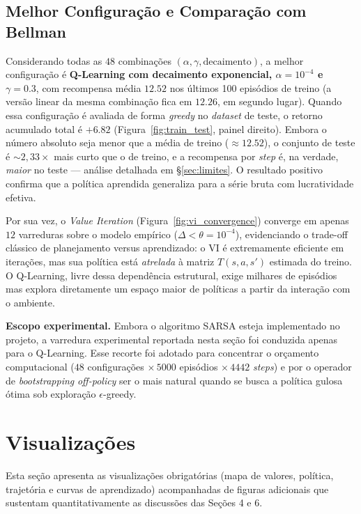 \documentclass{article}
\begin{document}
\subsection{Melhor Configuração e Comparação com Bellman}
Considerando todas as $48$ combinações $(\alpha, \gamma, \text{decaimento})$, a melhor configuração é \textbf{Q-Learning com decaimento exponencial, $\alpha=10^{-4}$ e $\gamma=0.3$}, com recompensa média $12.52$ nos últimos 100 episódios de treino (a versão linear da mesma combinação fica em $12.26$, em segundo lugar). Quando essa configuração é avaliada de forma \textit{greedy} no \textit{dataset} de teste, o retorno acumulado total é $+6.82$ (Figura~\ref{fig:train_test}, painel direito). Embora o número absoluto seja menor que a média de treino ($\approx 12.52$), o conjunto de teste é $\sim$$2{,}33\times$ mais curto que o de treino, e a recompensa por \textit{step} é, na verdade, \textit{maior} no teste — análise detalhada em §\ref{sec:limites}. O resultado positivo confirma que a política aprendida generaliza para a série bruta com lucratividade efetiva.

Por sua vez, o \textit{Value Iteration} (Figura~\ref{fig:vi_convergence}) converge em apenas $12$ varreduras sobre o modelo empírico ($\Delta < \theta = 10^{-4}$), evidenciando o trade-off clássico de planejamento versus aprendizado: o VI é extremamente eficiente em iterações, mas sua política está \textit{atrelada} à matriz $T(s,a,s')$ estimada do treino. O Q-Learning, livre dessa dependência estrutural, exige milhares de episódios mas explora diretamente um espaço maior de políticas a partir da interação com o ambiente.

\textbf{Escopo experimental.} Embora o algoritmo SARSA esteja implementado no projeto, a varredura experimental reportada nesta seção foi conduzida apenas para o Q-Learning. Esse recorte foi adotado para concentrar o orçamento computacional ($48$ configurações $\times\,5000$ episódios $\times\,4442$ \textit{steps}) e por o operador de \textit{bootstrapping} \textit{off-policy} ser o mais natural quando se busca a política gulosa ótima sob exploração $\epsilon$-greedy.

\section{Visualizações}\label{sec:vis}
Esta seção apresenta as visualizações obrigatórias (mapa de valores, política, trajetória e curvas de aprendizado) acompanhadas de figuras adicionais que sustentam quantitativamente as discussões das Seções 4 e 6.
\end{document}
